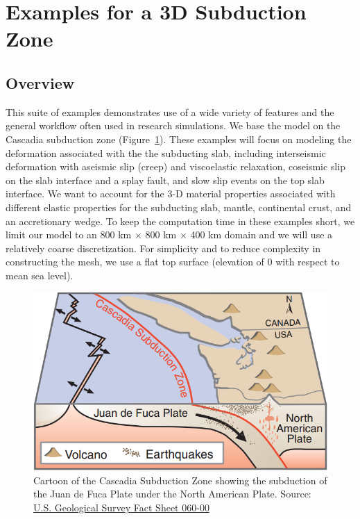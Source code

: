 \section{Examples for a 3D Subduction Zone}
\label{sec:example:subduction:3d}

\subsection{Overview}

This suite of examples demonstrates use of a wide variety of features
and the general workflow often used in research simulations. We base
the model on the Cascadia subduction zone
(Figure~\ref{fig:example:subduction:3d:cascadia}). These examples will
focus on modeling the deformation associated with the the subducting
slab, including interseismic deformation with aseismic slip (creep)
and viscoelastic relaxation, coseismic slip on the slab interface and
a splay fault, and slow slip events on the top slab interface. We want
to account for the 3-D material properties associated with different
elastic properties for the subducting slab, mantle, continental crust,
and an accretionary wedge. To keep the computation time in these
examples short, we limit our model to an 800 km $\times$ 800 km
$\times$ 400 km domain and we will use a relatively coarse
discretization. For simplicity and to reduce complexity in constructing
the mesh, we use a flat top surface (elevation of 0 with respect
to mean sea level).

\begin{figure}[htbp]
  \includegraphics[width=4.5in]{examples/figs/subduction3d_cascadia}
  \caption{Cartoon of the Cascadia Subduction Zone showing the
    subduction of the Juan de Fuca Plate under the North American
    Plate. Source:
    \href{https://pubs.usgs.gov/fs/2000/fs060-00/}{U.S. Geological
      Survey Fact Sheet 060-00}}
  \label{fig:example:subduction:3d:cascadia}
\end{figure}


